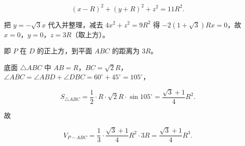 \begin{answer}
\nopagebreak[4]
\[(x-R)^2+(y+R)^2+z^2=11R^2.\]

把 $y=-\sqrt3x$ 代入并整理，减去 $4x^2+z^2=9R^2$ 得 $-2(1+\sqrt3)Rx=0$，故 $x=0$，$y=0$，$z=3R$（取上方）。

即 $P$ 在 $D$ 的正上方，到平面 $ABC$ 的距离为 $3R$。

底面 $\triangle ABC$ 中 $AB=R$，$BC=\sqrt2R$，$\angle ABC=\angle ABD+\angle DBC=60^\circ+45^\circ=105^\circ$，

\nopagebreak[4]
\[S_{\triangle ABC}=\frac12\cdot R\cdot\sqrt2R\cdot\sin105^\circ=\frac{\sqrt3+1}4R^2.\]

故

\nopagebreak[4]
\[V_{P-ABC}=\frac13\cdot\frac{\sqrt3+1}4R^2\cdot3R=\frac{\sqrt3+1}4R^3.\]


\end{answer}

